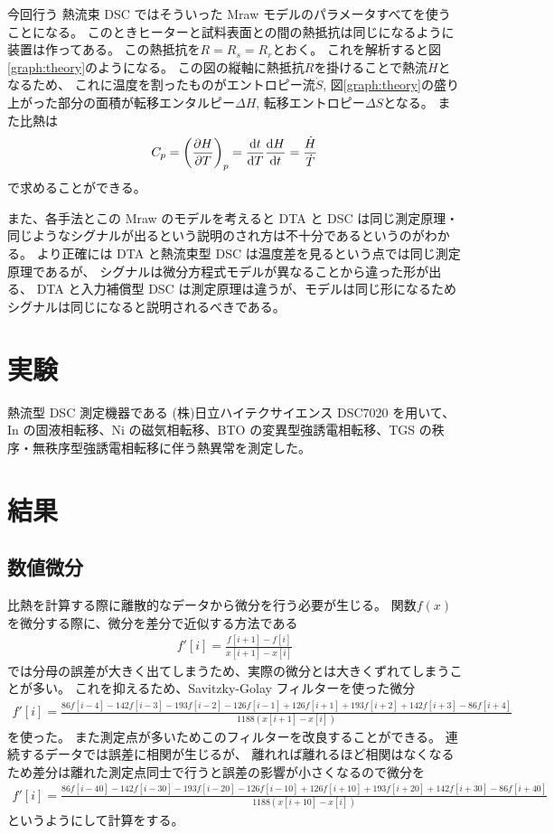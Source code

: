 \documentclass[9pt,dvipdfmx,a4paper]{jsarticle}
\begin{document}
今回行う 熱流束 DSC ではそういった Mraw モデルのパラメータすべてを使うことになる。
このときヒーターと試料表面との間の熱抵抗は同じになるように装置は作ってある。
この熱抵抗を\(R=R_s=R_r\)とおく。
これを解析すると図\ref{graph:theory}のようになる\cite{saito1987}。
この図の縦軸に熱抵抗\(R\)を掛けることで熱流\(\dot{H}\)となるため、
これに温度を割ったものがエントロピー流\(\dot{S}\),
図\ref{graph:theory}の盛り上がった部分の面積が転移エンタルピー\(\Delta H\), 転移エントロピー\(\Delta S\)となる。
また比熱は
\begin{align}
    C_p = \qty(\pdv{H}{T})_p = \dv{t}{T}\dv{H}{t} = \frac{\dot{H}}{\dot{T}}
\end{align}
で求めることができる。

また、各手法とこの Mraw のモデルを考えると DTA と DSC は同じ測定原理・同じようなシグナルが出るという説明のされ方は不十分であるというのがわかる。
より正確には DTA と熱流束型 DSC は温度差を見るという点では同じ測定原理であるが、
シグナルは微分方程式モデルが異なることから違った形が出る、
DTA と入力補償型 DSC は測定原理は違うが、モデルは同じ形になるためシグナルは同じになると説明されるべきである。

\section{実験}
熱流型 DSC 測定機器である (株)日立ハイテクサイエンス DSC7020 を用いて、
In の固液相転移、Ni の磁気相転移、BTO の変異型強誘電相転移、TGS の秩序・無秩序型強誘電相転移に伴う熱異常を測定した。

\section{結果}
\subsection{数値微分}
比熱を計算する際に離散的なデータから微分を行う必要が生じる。
関数\(f(x)\)を微分する際に、微分を差分で近似する方法である
\begin{align}
    f'[i] = \frac{f[i+1]-f[i]}{x[i+1]-x[i]}
\end{align}
では分母の誤差が大きく出てしまうため、実際の微分とは大きくずれてしまうことが多い。
これを抑えるため、Savitzky-Golay フィルターを使った微分
\begin{align}
    f'[i] = \frac{86f[i-4]-142f[i-3]-193f[i-2]-126f[i-1]+126f[i+1]+193f[i+2]+142f[i+3]-86f[i+4]}{1188(x[i+1]-x[i])}
\end{align}
を使った。
また測定点が多いためこのフィルターを改良することができる。
連続するデータでは誤差に相関が生じるが、
離れれば離れるほど相関はなくなるため差分は離れた測定点同士で行うと誤差の影響が小さくなるので微分を
\begin{align}
    f'[i] = \frac{86f[i-40]-142f[i-30]-193f[i-20]-126f[i-10]+126f[i+10]+193f[i+20]+142f[i+30]-86f[i+40]}{1188( x[i+10]-x[i])}
\end{align}
というようにして計算をする。
\end{document}
